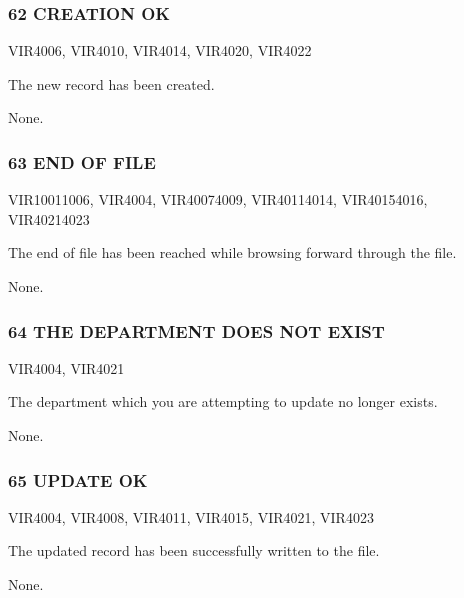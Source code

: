 \documentclass[letterpaper,10pt,english]{sphinxmanual}
\begin{document}
\subsubsection{62 CREATION OK}
\label{\detokenize{messages:id1}}\begin{description}
\sphinxAtStartPar
VIR4006, VIR4010, VIR4014, VIR4020, VIR4022

\sphinxAtStartPar
The new record has been created.

\sphinxAtStartPar
None.

\end{description}


\subsubsection{63 END OF FILE}
\label{\detokenize{messages:end-of-file}}\begin{description}
\sphinxAtStartPar
VIR1001\sphinxhyphen{}1006, VIR4004, VIR4007\sphinxhyphen{}4009, VIR4011\sphinxhyphen{}4014, VIR4015\sphinxhyphen{}4016, VIR4021\sphinxhyphen{}4023

\sphinxAtStartPar
The end of file has been reached while browsing forward through the file.

\sphinxAtStartPar
None.

\end{description}


\subsubsection{64 THE DEPARTMENT DOES NOT EXIST}
\label{\detokenize{messages:the-department-does-not-exist}}\begin{description}
\sphinxAtStartPar
VIR4004, VIR4021

\sphinxAtStartPar
The department which you are attempting to update no longer exists.

\sphinxAtStartPar
None.

\end{description}


\subsubsection{65 UPDATE OK}
\label{\detokenize{messages:id2}}\begin{description}
\sphinxAtStartPar
VIR4004, VIR4008, VIR4011, VIR4015, VIR4021, VIR4023

\sphinxAtStartPar
The updated record has been successfully written to the file.

\sphinxAtStartPar
None.

\end{description}
\end{document}
